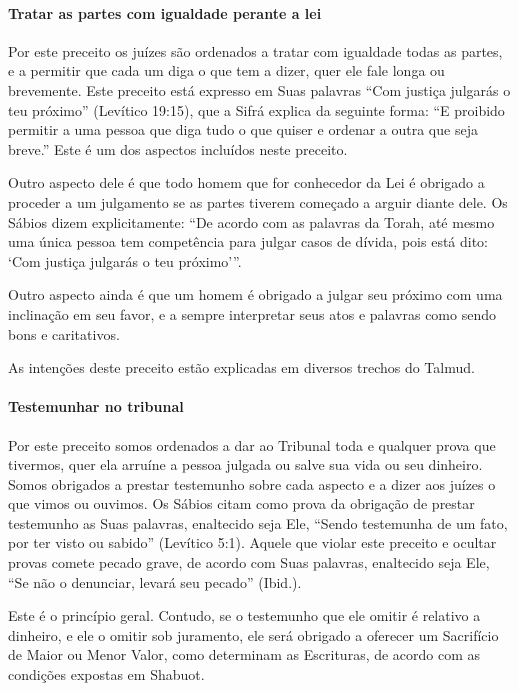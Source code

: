 \paragraph{Tratar as partes com igualdade perante a lei}

Por este preceito os juízes são ordenados a tratar com igualdade todas
as partes, e a permitir que cada um diga o que tem a dizer, quer ele
fale longa ou brevemente. Este preceito está expresso em Suas palavras
``Com justiça julgarás o teu próximo'' (Levítico 19:15), que a Sifrá
explica da seguinte forma: ``E proibido permitir a uma pessoa que diga
tudo o que quiser e ordenar a outra que seja breve.'' Este é um dos
aspectos incluídos neste preceito.

Outro aspecto dele é que todo homem que for conhecedor da Lei é obrigado
a proceder a um julgamento se as partes tiverem começado a arguir diante
dele. Os Sábios dizem explicitamente: ``De acordo com as palavras da
Torah, até mesmo uma única pessoa tem competência para julgar casos de
dívida, pois está dito: `Com justiça julgarás o teu próximo'''.

Outro aspecto ainda é que um homem é obrigado a julgar seu próximo com
uma inclinação em seu favor, e a sempre interpretar seus atos e
palavras como sendo bons e caritativos.

As intenções deste preceito estão explicadas em diversos trechos do
Talmud.

\paragraph{Testemunhar no tribunal}

Por este preceito somos ordenados a dar ao Tribunal toda e qualquer
prova que tivermos, quer ela arruíne a pessoa julgada ou salve sua vida
ou seu dinheiro. Somos obrigados a prestar testemunho sobre cada aspecto
e a dizer aos juízes o que vimos ou ouvimos. Os Sábios citam como prova
da obrigação de prestar testemunho as Suas palavras, enaltecido seja
Ele, ``Sendo testemunha de um fato, por ter visto ou sabido'' (Levítico
5:1). Aquele que violar este preceito e ocultar provas comete pecado
grave, de acordo com Suas palavras, enaltecido seja Ele, ``Se não o
denunciar, levará seu pecado'' (Ibid.).

Este é o princípio geral. Contudo, se o testemunho que ele omitir é
relativo a dinheiro, e ele o omitir sob juramento, ele será obrigado a
oferecer um Sacrifício de Maior ou Menor Valor, como determinam as
Escrituras, de acordo com as condições expostas em Shabuot.

